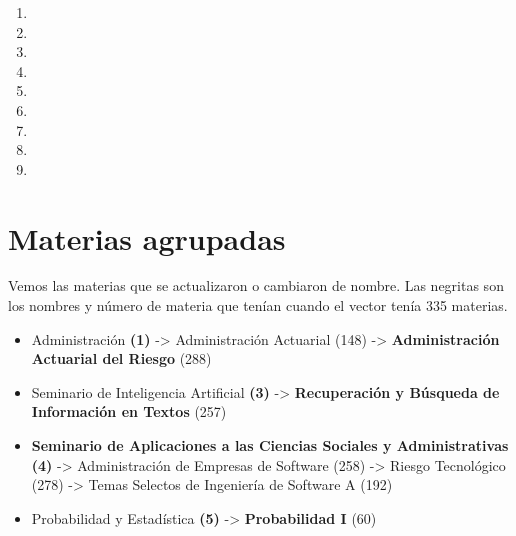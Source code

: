 \begin{appendices}
\begin{enumerate}
  \item 
  
  \item 
  
  \item 
  
  \item 
  
  \item 
  
  \item 
  
  \item 
  
  \item 
  
  \item 
\end{enumerate}



\chapter{Materias agrupadas}\label{materias_agrupadas}

Vemos las materias que se actualizaron o cambiaron de nombre. Las negritas son los nombres y número de materia que tenían cuando el vector tenía 335 materias.


  \begin{itemize}
  \item Administración \textbf{(1)} -> Administración Actuarial (148) -> \textbf{Administración Actuarial del Riesgo} (288)
  
  \item Seminario de Inteligencia Artificial \textbf{(3)} -> \textbf{Recuperación y Búsqueda de Información en Textos} (257)
  
  \item \textbf{Seminario de Aplicaciones a las Ciencias Sociales y Administrativas (4)} -> Administración de Empresas de Software (258) -> Riesgo Tecnológico (278) -> Temas Selectos de Ingeniería de Software A (192)
  
  \item Probabilidad y Estadística \textbf{(5)} -> \textbf{Probabilidad I} (60)


\end{itemize}
\end{appendices}
